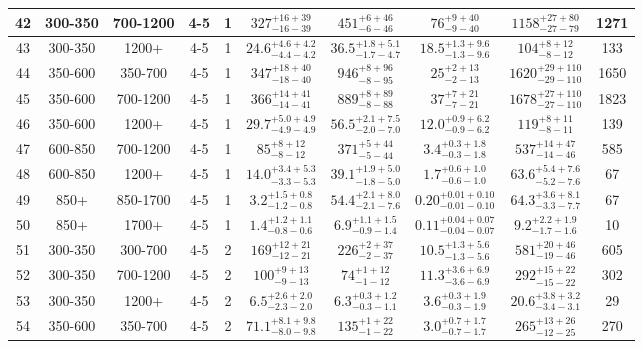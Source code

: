 \documentclass[11pt, oneside]{article}
\begin{document}
\begin{table}
{\begin{tabular}{ |c|c|c|c|c||c|c|c||c|c| }
42 & 300-350 & 700-1200 & 4-5 & 1 & $327^{+16+39}_{-16-39}$ & $451^{+ 6+46}_{- 6-46}$ & $76^{+ 9+40}_{- 9-40}$ & $1158^{+27+80}_{-27-79}$ & 1271 \\ \hline
43 & 300-350 & 1200+ & 4-5 & 1 & $24.6^{+4.6+4.2}_{-4.4-4.2}$ & $36.5^{+1.8+5.1}_{-1.7-4.7}$ & $18.5^{+1.3+9.6}_{-1.3-9.6}$ & $104^{+ 8+12}_{- 8-12}$ & 133 \\ \hline
44 & 350-600 & 350-700 & 4-5 & 1 & $347^{+18+40}_{-18-40}$ & $946^{+ 8+96}_{- 8-95}$ & $25^{+ 2+13}_{- 2-13}$ & $1620^{+29+110}_{-29-110}$ & 1650 \\ \hline
45 & 350-600 & 700-1200 & 4-5 & 1 & $366^{+14+41}_{-14-41}$ & $889^{+ 8+89}_{- 8-88}$ & $37^{+ 7+21}_{- 7-21}$ & $1678^{+27+110}_{-27-110}$ & 1823 \\ \hline
46 & 350-600 & 1200+ & 4-5 & 1 & $29.7^{+5.0+4.9}_{-4.9-4.9}$ & $56.5^{+2.1+7.5}_{-2.0-7.0}$ & $12.0^{+0.9+6.2}_{-0.9-6.2}$ & $119^{+ 8+11}_{- 8-11}$ & 139 \\ \hline
47 & 600-850 & 700-1200 & 4-5 & 1 & $85^{+ 8+12}_{- 8-12}$ & $371^{+ 5+44}_{- 5-44}$ & $3.4^{+0.3+1.8}_{-0.3-1.8}$ & $537^{+14+47}_{-14-46}$ & 585 \\ \hline
48 & 600-850 & 1200+ & 4-5 & 1 & $14.0^{+3.4+5.3}_{-3.3-5.3}$ & $39.1^{+1.9+5.0}_{-1.8-5.0}$ & $1.7^{+0.6+1.0}_{-0.6-1.0}$ & $63.6^{+5.4+7.6}_{-5.2-7.6}$ & 67 \\ \hline
49 & 850+ & 850-1700 & 4-5 & 1 & $3.2^{+1.5+0.8}_{-1.2-0.8}$ & $54.4^{+2.1+8.0}_{-2.1-7.6}$ & $0.20^{+0.01+0.10}_{-0.01-0.10}$ & $64.3^{+3.6+8.1}_{-3.3-7.7}$ & 67 \\ \hline
50 & 850+ & 1700+ & 4-5 & 1 & $1.4^{+1.2+1.1}_{-0.8-0.6}$ & $6.9^{+1.1+1.5}_{-0.9-1.4}$ & $0.11^{+0.04+0.07}_{-0.04-0.07}$ & $9.2^{+2.2+1.9}_{-1.7-1.6}$ & 10 \\ \hline
51 & 300-350 & 300-700 & 4-5 & 2 & $169^{+12+21}_{-12-21}$ & $226^{+ 2+37}_{- 2-37}$ & $10.5^{+1.3+5.6}_{-1.3-5.6}$ & $581^{+20+46}_{-19-46}$ & 605 \\ \hline
52 & 300-350 & 700-1200 & 4-5 & 2 & $100^{+ 9+13}_{- 9-13}$ & $74^{+ 1+12}_{- 1-12}$ & $11.3^{+3.6+6.9}_{-3.6-6.9}$ & $292^{+15+22}_{-15-22}$ & 302 \\ \hline
53 & 300-350 & 1200+ & 4-5 & 2 & $6.5^{+2.6+2.0}_{-2.3-2.0}$ & $6.3^{+0.3+1.2}_{-0.3-1.1}$ & $3.6^{+0.3+1.9}_{-0.3-1.9}$ & $20.6^{+3.8+3.2}_{-3.4-3.1}$ & 29 \\ \hline
54 & 350-600 & 350-700 & 4-5 & 2 & $71.1^{+8.1+9.8}_{-8.0-9.8}$ & $135^{+ 1+22}_{- 1-22}$ & $3.0^{+0.7+1.7}_{-0.7-1.7}$ & $265^{+13+26}_{-12-25}$ & 270 \\ \hline

\end{tabular}}
\end{table}
\end{document}
